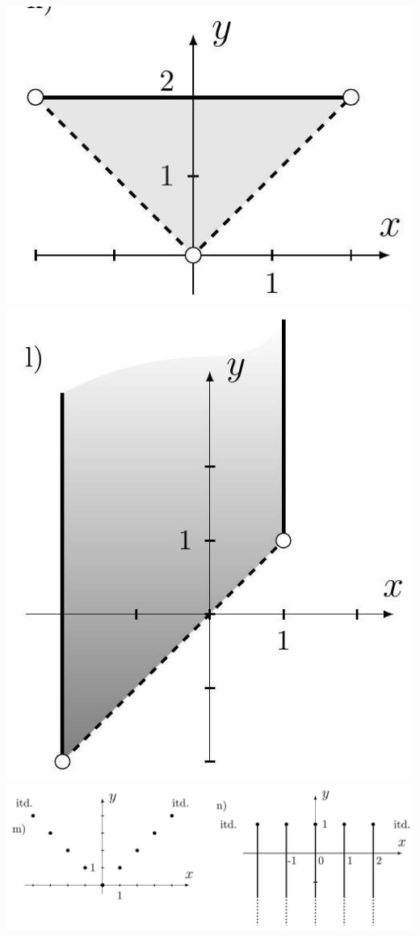 \documentclass[10pt]{article}
\begin{document}
\begin{enumerate}
\includegraphics[max width=\textwidth, center]{2024_11_21_8f01584889ff06348ae7g-070}\\
\includegraphics[max width=\textwidth, center]{2024_11_21_8f01584889ff06348ae7g-070(2)}\\
\includegraphics[max width=\textwidth, center]{2024_11_21_8f01584889ff06348ae7g-070(3)}\\

\end{enumerate}
\end{document}
